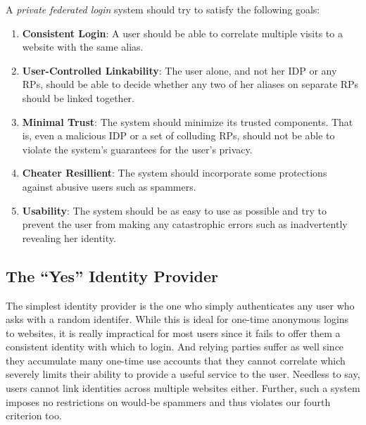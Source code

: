 \documentclass{llncs}
\begin{document}

A \emph{private federated login} system should try to satisfy the following
goals:

\begin{enumerate}
  \item \textbf{Consistent Login}: A user should be able to correlate multiple
  visits to a website with the same alias.
  \item \textbf{User-Controlled Linkability}: The user alone, and not her IDP or
  any RPs, should be able to decide whether any two of her aliases on separate
  RPs should be linked together.
  \item \textbf{Minimal Trust}: The system should minimize its trusted
  components. That is, even a malicious IDP or a set of colluding RPs, should
  not be able to violate the system's guarantees for the user's privacy.
  \item \textbf{Cheater Resillient}: The system should incorporate some
  protections against abusive users such as spammers.
  \item \textbf{Usability}: The system should be as easy to use as possible and
  try to prevent the user from making any catastrophic errors such as
  inadvertently revealing her identity.
\end{enumerate}


\subsection{The ``Yes'' Identity Provider}

The simplest identity provider is the one who simply authenticates any user who
asks with a random identifer. While this is ideal for one-time anonymous logins
to websites, it is really impractical for most users since it fails to offer
them a consistent identity with which to login. And relying parties suffer as
well since they accumulate many one-time use accounts that they cannot correlate
which severely limits their ability to provide a useful service to the user.
Needless to say, users cannot link identities across multiple websites either.
Further, such a system imposes no restrictions on would-be spammers and thus
violates our fourth criterion too.
\end{document}
